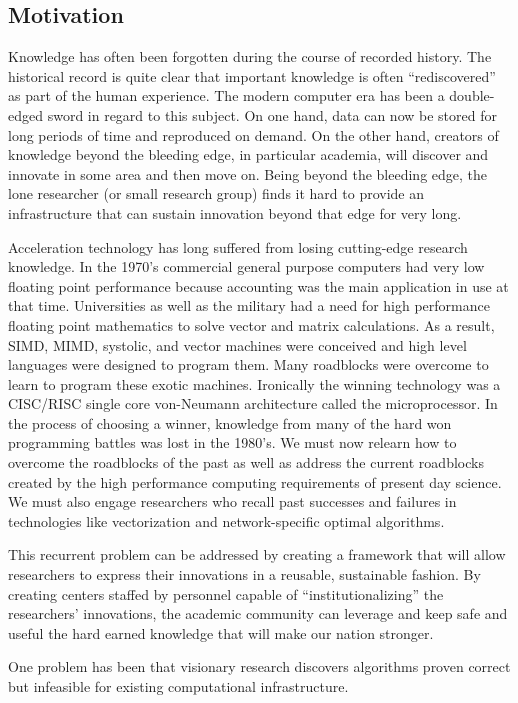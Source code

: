\subsection{Motivation}
Knowledge has often been forgotten during the course of recorded history.
The historical record is quite clear that important knowledge is often ``rediscovered'' as part of the human experience.
The modern computer era has been a double-edged sword in regard to this subject.
On one hand, data can now be stored for long periods of time and reproduced on demand. 
On the other hand, creators of knowledge beyond the bleeding edge, in particular academia,
will discover and innovate in some area and then move on. 
Being beyond the bleeding edge, the lone researcher (or small research group) finds it hard to provide an infrastructure that can sustain innovation beyond that edge for very long.

Acceleration technology has long suffered from losing cutting-edge research knowledge. 
In the 1970's commercial general purpose computers had very low floating point performance because accounting was the main application in use at that time. 
Universities as well as the military had a need for high performance floating point mathematics to solve vector and matrix calculations. 
As a result, SIMD, MIMD, systolic, and vector machines were conceived and high level languages were designed to program them. 
Many roadblocks were overcome to learn to program these exotic machines. 
Ironically the winning technology was a CISC/RISC single core von-Neumann architecture called the microprocessor. 
In the process of choosing a winner, knowledge from many of the hard won programming battles was lost in the 1980's. 
We must now relearn how to overcome the roadblocks of the past as well as address the current roadblocks created by the high performance computing requirements of present day science. 
We must also engage researchers who recall past successes and failures in technologies like vectorization and network-specific optimal algorithms.

This recurrent problem can be addressed by creating a framework that will allow researchers to express their innovations in a reusable, sustainable fashion. 
By creating centers staffed by personnel capable of ``institutionalizing'' the researchers' innovations, the academic community can leverage and keep safe and useful the hard earned knowledge that will make our nation stronger.

One problem has been that visionary research discovers algorithms proven correct but infeasible for existing computational infrastructure.

